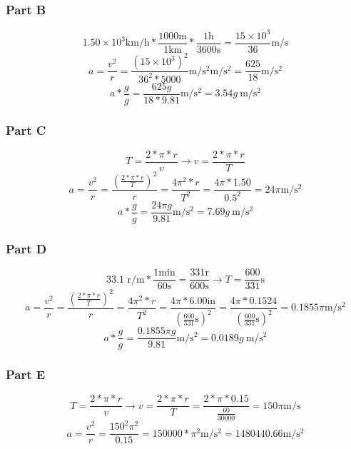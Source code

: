 \documentclass[12pt]{article}
\begin{document}
\subsubsection*{Part B}
\[ 1.50\times10^3 \unit{\kilo\meter/\hour} * \frac{1000\unit{\meter}}{1\unit{\kilo\meter}} * \frac{1\unit{\hour}}{3600\unit{\second}} = \frac{15\times10^3}{36}\unit{\meter/\second} \]
\[ a = \frac{v^2}{r} = \frac{(15\times10^3)^2}{36^2*5000}\unit{\meter/\second^2} \unit{\meter/\second^2} = \frac{625}{18} \unit{\meter/\second^2} \]
\[ a*\frac{g}{g} = \frac{625g}{18*9.81} \unit{\meter/\second^2} = \boxed{3.54g\ \unit{\meter/\second^2}}\]

\subsubsection*{Part C}
\[ T = \frac{2*\pi*r}{v} \rightarrow v = \frac{2*\pi*r}{T} \]
\[ a = \frac{v^2}{r} = \frac{\left(\frac{2*\pi*r}{T}\right)^2}{r} = \frac{4\pi^2*r}{T^2} = \frac{4\pi*1.50}{0.5^2} = 24\pi \unit{\meter/\second^2} \]
\[ a*\frac{g}{g} = \frac{24\pi g}{9.81} \unit{\meter/\second^2} = \boxed{7.69g\ \unit{\meter/\second^2}}\]

\pagebreak
\subsubsection*{Part D}
\[ 33.1 \text{ r/m} * \frac{1\unit{\minute}}{60\unit{\second}} = \frac{331 \text{r}}{600 \unit{\second}} \rightarrow T = \frac{600}{331} \unit{\second} \]
\[ a = \frac{v^2}{r} = \frac{\left(\frac{2*\pi*r}{T}\right)^2}{r} = \frac{4\pi^2*r}{T^2} = \frac{4\pi*6.00\text{in}}{\left(\frac{600}{331} \unit{\second}\right)^2} = \frac{4\pi*0.1524}{\left(\frac{600}{331} \unit{\second}\right)^2} = 0.1855\pi \unit{\meter/\second^2} \]
\[ a*\frac{g}{g} = \frac{0.1855\pi g}{9.81} \unit{\meter/\second^2} = \boxed{0.0189g\ \unit{\meter/\second^2}}\]

\subsubsection*{Part E}
\[ T = \frac{2*\pi*r}{v} \rightarrow v = \frac{2*\pi*r}{T} = \frac{2*\pi*0.15}{\frac{60}{30000}} = 150\pi \unit{\meter/\second}\]
\[ a = \frac{v^2}{r} = \frac{150^2\pi^2}{0.15} = 150000*\pi^2 \unit{\meter/\second^2} = \boxed{1480440.66 \unit{\meter/\second^2}} \]
\end{document}

